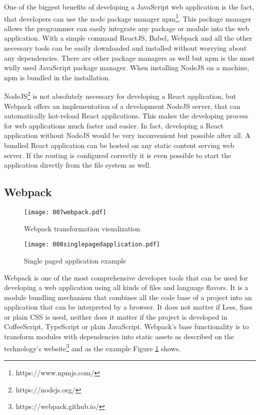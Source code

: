 
One of the biggest benefits of developing a JavaScript web application is the fact, that developers can use the node package manager npm\footnote{https://www.npmjs.com/}. This package manager allows the programmer can easily integrate any package or module into the web application. With a simple command \mbox{ReactJS}, \mbox{\mbox{Babel}}, \mbox{Webpack} and all the other necessary tools can be easily downloaded and installed without worrying about any dependencies. There are other package managers as well but npm is the most widly used JavaScript package manager. When installing NodeJS on a machine, npm is bundled in the installation. 

NodeJS\footnote{https://nodejs.org/} is not absolutely necessary for developing a React application, but \mbox{Webpack} offers an implementation of a development NodeJS server, that can automatically hot-reload React applications. This makes the developing process for web applications much faster and easier. In fact, developing a React application without NodeJS would be very inconvenient but possible after all. A bundled React application can be hosted on any static content serving web server. If the routing is configured correctly it is even possible to start the application directly from the file system as well.

\subsection{Webpack}

\begin{figure}
  \centering
  \texttt{[image: 007webpack.pdf]}
  \caption{Webpack transformation visualization}
  \label{fig:webpack}
\end{figure}

\begin{figure}
  \centering
  \texttt{[image: 008singlepagedapplication.pdf]}
  \caption{Single paged application example}
  \label{fig:singlepagedapplication}
\end{figure}

\mbox{Webpack} is one of the most comprehensive developer tools that can be used for developing a web application using all kinds of files and language flavors. It is a module bundling mechanism that combines all the code base of a project into an application that can be interpreted by a browser. It does not matter if Less, Sass or plain CSS is used, neither does it matter if the project is developed in CoffeeScript, TypeScript or plain JavaScript. \mbox{Webpack's} base functionality is to transform modules with dependencies into static assets as described on the technology's website\footnote{https://webpack.github.io/} and as the example Figure \ref{fig:webpack} shows. 

